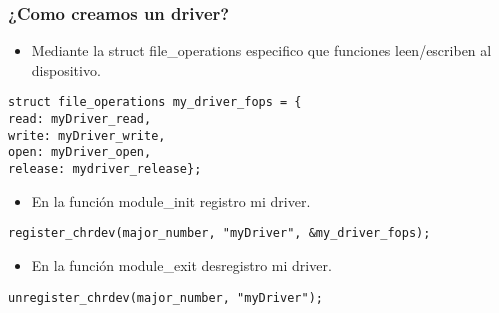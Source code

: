 \begin{frame}[fragile]
\frametitle{¿Como creamos un driver?}
  \begin{itemize}
  \item Mediante la struct \alert{file\_operations} especifico que funciones leen/escriben al dispositivo. 
  \end{itemize}
\begin{lstlisting}
struct file_operations my_driver_fops = {
read: myDriver_read,
write: myDriver_write,
open: myDriver_open,
release: mydriver_release};
\end{lstlisting}
\begin{itemize}
 \item En la función module\_init registro mi driver. 
\end{itemize}
\begin{lstlisting}
register_chrdev(major_number, "myDriver", &my_driver_fops);
\end{lstlisting}

\begin{itemize}
 \item En la función module\_exit desregistro mi driver. 
\end{itemize}
\begin{lstlisting}
unregister_chrdev(major_number, "myDriver");
\end{lstlisting}
\end{frame}





